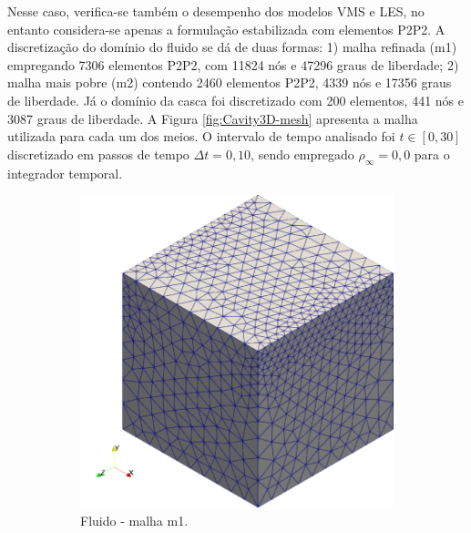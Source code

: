 Nesse caso, verifica-se também o desempenho dos modelos VMS e LES, no entanto considera-se apenas a formulação estabilizada com elementos P2P2. A discretização do domínio do fluido se dá de duas formas: 1) malha refinada (m1) empregando 7306 elementos P2P2, com 11824 nós e 47296 graus de liberdade; 2) malha mais pobre (m2) contendo 2460 elementos P2P2, 4339 nós e 17356 graus de liberdade. Já o domínio da casca foi discretizado com 200 elementos, 441 nós e 3087 graus de liberdade. A Figura \ref{fig:Cavity3D-mesh} apresenta a malha utilizada para cada um dos meios. O intervalo de tempo analisado foi $t\in[0,30]$ discretizado em passos de tempo $\Delta t=0,10$, sendo empregado $\rho_\infty=0,0$ para o integrador temporal.

\begin{figure}[h!]
    \centering
    \caption{Cavidade tridimensional - Discretização espacial.}
    \begin{subfigure}[b]{0.4\textwidth}
        \centering
        \includegraphics[width=\linewidth]{Figuras/FSI-Cavity3D/fluid-mesh.png}
        \caption{Fluido - malha m1.}
    \end{subfigure}
    \begin{subfigure}[b]{0.4\textwidth}
        \centering

\end{subfigure}
\end{figure}
